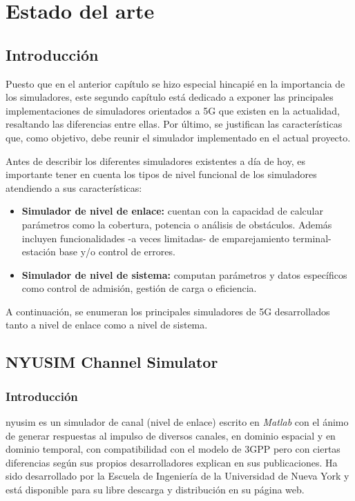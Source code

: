 \chapter{Estado del arte}\label{cap.estado del arte}

\section{Introducción}

Puesto que en el anterior capítulo se hizo especial hincapié en la importancia de los simuladores, este segundo capítulo está dedicado a exponer las principales implementaciones de simuladores orientados a 5G que existen en la actualidad, resaltando las diferencias entre ellas. Por último, se justifican las características que, como objetivo, debe reunir el simulador implementado en el actual proyecto.

Antes de describir los diferentes simuladores existentes a día de hoy, es importante tener en cuenta los tipos de nivel funcional de los simuladores atendiendo a sus características:
\begin{itemize}
    \item \textbf{Simulador de nivel de enlace:} cuentan con la capacidad de calcular parámetros como la cobertura, potencia o análisis de obstáculos. Además incluyen funcionalidades -a veces limitadas- de emparejamiento terminal-estación base y/o control de errores.
    \item \textbf{Simulador de nivel de sistema:} computan parámetros y datos específicos como control de admisión, gestión de carga o eficiencia.
\end{itemize}

A continuación, se enumeran los principales simuladores de 5G desarrollados tanto a nivel de enlace como a nivel de sistema.

\section{NYUSIM Channel Simulator}
\subsection{Introducción}
\ac{nyusim} \cite{nyusim} es un simulador de canal (nivel de enlace) escrito en \textit{Matlab} con el ánimo de generar respuestas al impulso de diversos canales, en dominio espacial y en dominio temporal, con compatibilidad con el modelo de 3GPP pero con ciertas diferencias según sus propios desarrolladores explican en sus publicaciones. Ha sido desarrollado por la Escuela de Ingeniería de la Universidad de Nueva York y está disponible para su libre descarga y distribución en su página web.

